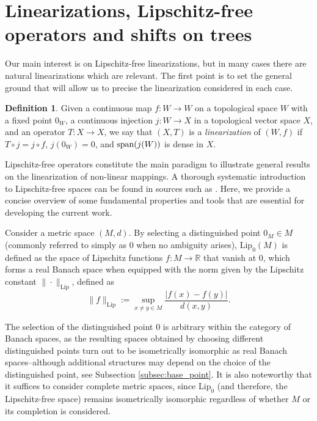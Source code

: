 \documentclass[12pt,english]{amsart}
\numberwithin{equation}{section}
\theoremstyle{plain}
\theoremstyle{definition}
\newtheorem{definition}[theorem]{Definition}
\def\lip{ \text{Lip}}
\def\sp{\hbox{{\rm span}}}
\begin{document}
\section{Linearizations, Lipschitz-free operators and shifts on trees}

Our main  interest is on Lipschitz-free linearizations, but in many cases there are natural linearizations which are relevant. The first point is to set the general ground that will allow us to precise the linearization considered in each case. 

\begin{definition}
    Given a continuous map $f\colon W\to W$ on a topological space $W$ with a fixed point $0_W$, a continuous injection $j:W\to X$ in a topological vector space $X$, and an operator $T:X\to X$, we say that $(X,T)$ is a \emph{linearization} of $(W,f)$ if $T\circ j=j\circ f$, $j(0_W)=0$, and $\sp (j(W))$ is dense in $X$. 
\end{definition}

Lipschitz-free operators constitute the main paradigm to illustrate general results on the linearization of non-linear mappings. 
A thorough systematic introduction to Lipschitz-free spaces can be found in sources such as \cite{Wea18}. Here, we provide a concise overview of some fundamental properties and tools that are essential for developing the current work.


Consider a metric space $(M, d)$. By selecting a distinguished  point $0_M \in M$ (commonly referred to simply as $0$ when no ambiguity arises), $\lip_0(M)$ is defined as the space of Lipschitz functions $f \colon M \to \mathbb{R}$ that vanish at $0$, which forms a real Banach space when equipped with the norm given by the Lipschitz constant $\|\cdot\|_{\text{Lip}}$, defined as
\begin{equation*}
  \|f\|_{\text{Lip}} := \sup_{x \neq y \in M} \frac{|f(x) - f(y)|}{d(x,y)}.
\end{equation*}

The selection of the distinguished point $0$ is arbitrary within the category of Banach spaces, as the resulting spaces obtained by choosing different distinguished points turn out to be isometrically isomorphic as real Banach spaces--although additional structures may depend on the choice of the distinguished point, see Subsection \ref{subsec:base_point}. 
It is also noteworthy that it suffices to consider complete metric spaces, since $\lip_0$ (and therefore, the Lipschitz-free space) remains isometrically isomorphic regardless of whether $M$ or its completion is considered. 
\end{document}
